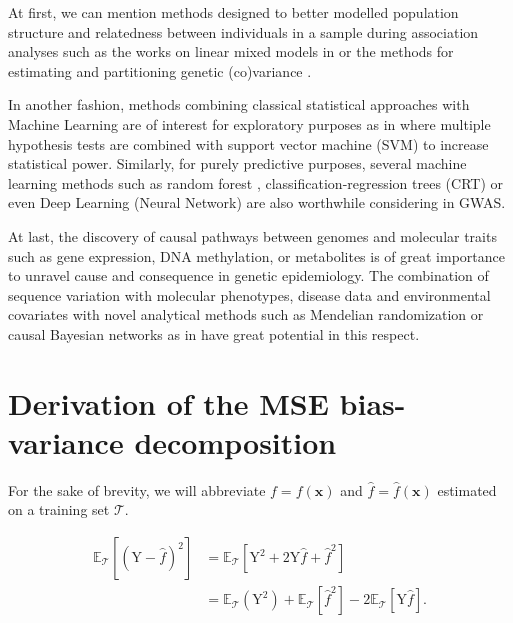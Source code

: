 \documentclass[]{book}
\begin{document}
At first, we can mention methods designed to better modelled population
structure and relatedness between individuals in a sample during
association analyses such as the works on linear mixed models in
\citep{listgarten_improved_2012, segura2012efficient, kang2010variance} or
the methods for estimating and partitioning genetic (co)variance
\citep{finucane2015partitioning, yang2010common}.

In another fashion, methods combining classical statistical approaches
with Machine Learning are of interest for exploratory purposes as in
\citep{mieth2016combining} where multiple hypothesis tests are combined with
support vector machine (SVM) to increase statistical power. Similarly,
for purely predictive purposes, several machine learning methods such as
random forest \citep{geurst_exploiting_2014}, classification-regression trees
(CRT) \citep{maciukiewicz2018gwas} or even Deep Learning (Neural Network)
\citep{fergus2018utilising} are also worthwhile considering in GWAS.

At last, the discovery of causal pathways between genomes and molecular
traits such as gene expression, DNA methylation, or metabolites is of
great importance to unravel cause and consequence in genetic
epidemiology. The combination of sequence variation with molecular
phenotypes, disease data and environmental covariates with novel
analytical methods such as Mendelian randomization
\citep{davey2003mendelian, zhu2018causal} or causal Bayesian networks as in
\citep{rau2013joint} have great potential in this respect.

\hypertarget{appendix-annexes}{%
\appendix}


\hypertarget{biasvar}{%
\chapter{Derivation of the MSE bias-variance decomposition}\label{biasvar}}

For the sake of brevity, we will abbreviate \(f = f(\mathbf{x})\) and
\(\hat{f} = \hat{f}(\mathbf{x})\) estimated on a training set \(\mathcal{T}\).

\[\begin{aligned}
 \label{eq:bias-var}
\mathbb{E}_\mathcal{T}[(\mathrm{Y} - \hat{f})^2] & = \mathbb{E}_\mathcal{T} [\mathrm{Y}^2 + 2\mathrm{\mathrm{Y}}\hat{f} + \hat{f}^2] \\ \nonumber
& = \mathbb{E}_\mathcal{T}(\mathrm{Y}^2) + \mathbb{E}_\mathcal{T}[\hat{f}^2] - 2\mathbb{E}_\mathcal{T}[\mathrm{Y}\hat{f}].\end{aligned}\]
\end{document}

